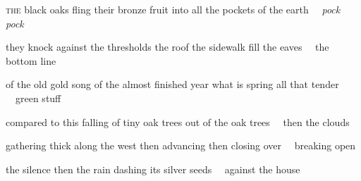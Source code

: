 \begin{poem}
\begin{stanza}
\textsc{the} black oaks\verseline
fling their bronze fruit\verseline
into all the pockets of the earth\verseline
~~\textit{pock pock}
\end{stanza}

\begin{stanza}
they knock against the thresholds\verseline
the roof the sidewalk\verseline
fill the eaves\verseline
~~the bottom line
\end{stanza}

\begin{stanza}
of the old gold song\verseline
of the almost finished year\verseline
what is spring all that tender\verseline
~~green stuff
\end{stanza}

\begin{stanza}
compared to this\verseline
falling of tiny oak trees\verseline
out of the oak trees\verseline
~~then the clouds
\end{stanza}

\begin{stanza}
gathering thick along the west\verseline
then advancing\verseline
then closing over\verseline
~~breaking open
\end{stanza}

\begin{stanza}
the silence\verseline
then the rain\verseline
dashing its silver seeds\verseline
~~against the house
\end{stanza}
\end{poem}


\newpage %


